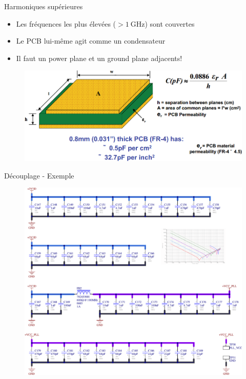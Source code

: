 \begin{frame}{Harmoniques supérieures}
    \begin{itemize}
        \item Les fréquences les plus élevées ($> \SI{1}{\giga\hertz}$) sont couvertes
        \item Le PCB lui-même agit comme un condensateur
        \item Il faut un power plane et un ground plane adjacents!
    \end{itemize}
    \begin{figure}
        \includegraphics[width=\textwidth, height=0.55\textheight, keepaspectratio]{pictures/pcb-plane-capacitance.png}
    \end{figure}
\end{frame}

\begin{frame}{Découplage - Exemple}
    \begin{figure}
        \includegraphics[width=\textwidth, height=0.75\textheight, keepaspectratio]{pictures/decoupling-example-pll.png}
    \end{figure}
\end{frame}

